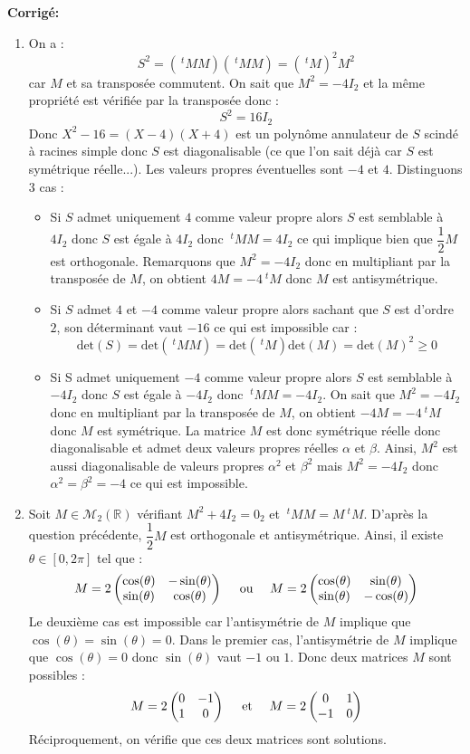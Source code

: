 \documentclass[a4paper,twoside,french,11pt]{VcCours}
\newcommand{\corr}{\textbf{Corrigé:}}
\begin{document}
\corr \begin{enumerate}
\item On a :
$$ S^2 = (~^tM M)(~^tM M) = (~^tM)^2 M^2$$
car $M$ et sa transposée commutent. On sait que $M^2 = -4 I_2$ et la même propriété est vérifiée par la transposée donc :
$$ S^2 = 16 I_2$$
Donc $X^2-16=(X-4)(X+4)$ est un polynôme annulateur de $S$ scindé à racines simple donc $S$ est diagonalisable (ce que l'on sait déjà car $S$ est symétrique réelle...). Les valeurs propres éventuelles sont $-4$ et $4$. Distinguons $3$ cas :
\begin{itemize}
\item Si $S$ admet uniquement $4$ comme valeur propre alors $S$ est semblable à $4I_2$ donc $S$ est égale à $4I_2$ donc $~^tM M=4I_2$ ce qui implique bien que $\dfrac{1}{2}M$ est orthogonale. Remarquons que $M^2=-4I_2$ donc en multipliant par la transposée de $M$, on obtient $4M=-4~^tM$ donc $M$ est antisymétrique.
\item Si $S$ admet $4$ et $-4$ comme valeur propre alors sachant que $S$ est d'ordre $2$, son déterminant vaut $-16$ ce qui est impossible car :
$$ \textrm{det}(S) = \textrm{det}(~^tM M) = \textrm{det}(~^tM) \textrm{det}( M)= \textrm{det}(M)^2 \geq 0$$
\item Si S admet uniquement $-4$ comme valeur propre alors $S$ est semblable à $-4I_2$ donc $S$ est égale à $-4I_2$ donc $~^tM M=-4I_2$. On sait que $M^2=-4I_2$ donc en multipliant par la transposée de $M$, on obtient $-4M=-4~^tM$ donc $M$ est symétrique. La matrice $M$ est donc symétrique réelle donc diagonalisable et admet deux valeurs propres réelles $\alpha$ et $\beta$. Ainsi, $M^2$ est aussi diagonalisable de valeurs propres $\alpha^2$ et $\beta^2$ mais $M^2= -4I_2$ donc $\alpha^2= \beta^2 = -4$ ce qui est impossible.
\end{itemize}
\item Soit $M \in \mathcal{M}_2(\mathbb{R})$ vérifiant $M^2+4I_2=0_2$ et $~^tM M = M ~^tM$. D'après la question précédente, $\dfrac{1}{2} M$ est orthogonale et antisymétrique. Ainsi, il existe $\theta \in [0,2 \pi]$ tel que :
$$ M = 2 \begin{pmatrix}
\cos(\theta) & - \sin(\theta) \\
\sin(\theta) & \cos(\theta) 
\end{pmatrix}  \quad \hbox{ ou } \quad M = 2 \begin{pmatrix}
\cos(\theta) &  \sin(\theta) \\
\sin(\theta) & -\cos(\theta) 
\end{pmatrix}$$
Le deuxième cas est impossible car l'antisymétrie de $M$ implique que $\cos(\theta) = \sin(\theta)=0$. Dans le premier cas, l'antisymétrie de $M$ implique que $\cos(\theta)=0$ donc $\sin(\theta) $ vaut $-1$ ou $1$. Donc deux matrices $M$ sont possibles :
$$ M = 2 \begin{pmatrix}
0 & -1 \\
1 & 0
\end{pmatrix} \quad \hbox{ et } \quad M =2 \begin{pmatrix}
0 & 1 \\
-1 & 0
\end{pmatrix}$$
Réciproquement, on vérifie que ces deux matrices sont solutions.
\end{enumerate}
\end{document}
